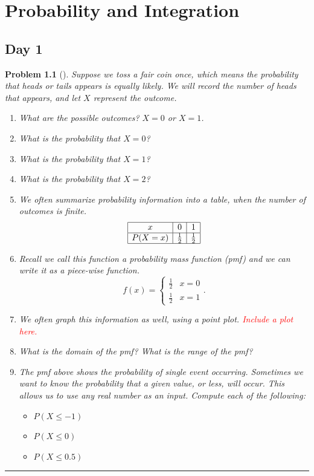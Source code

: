 \documentclass[letterpaper,oneside]{book}%
\theoremstyle{plain}
\theoremstyle{box}
\theoremstyle{problem}
\newtheorem{problemnum}{Problem}[chapter]
\newenvironment{problem}[1][]{\begin{problemnum}[#1]}{\end{problemnum}\nopagebreak\hrule\bigskip}
\begin{document}
\chapter{Probability and Integration}
\section{Day 1}
\begin{problem}
 Suppose we toss a fair coin once, which means the probability that heads or tails appears is equally likely. 
 We will record the number of heads that appears, and let $X$ represent the outcome. 
 \begin{enumerate}
  \item What are the possible outcomes?  $X=0$ or $X=1$. 
  \item What is the probability that $X=0$?   
  \item What is the probability that $X=1$?   
  \item What is the probability that $X=2$?   
  \item We often summarize probability information into a table, when the number of outcomes is finite. 
    $$\begin{array}{|c|c|c|}\hline
    x & 0&1\\\hline
    P(X=x) & \frac{1}{2} & \frac{1}{2}\\\hline
    \end{array}$$
    \item Recall we call this function a probability mass function (pmf) and we can write it as a piece-wise function.
      $$f(x) = 
    \begin{cases}
    \frac{1}{2} & x=0 \\
    \frac{1}{2} & x=1
    \end{cases}.$$
  \item We often graph this information as well, using a point plot. \textcolor{red}{Include a plot here.} 
  \item What is the domain of the pmf?  What is the range of the pmf?
  \item The pmf above shows the probability of single event occurring. Sometimes we want to know the probability that a given value, or less, will occur. This allows us to use any real number as an input. Compute each of the following: 
  \begin{itemize}
   \item $P(X\leq -1)$
   \item $P(X\leq 0)$
   \item $P(X\leq 0.5)$

\end{itemize}
\end{enumerate}
\end{problem}
\end{document}
